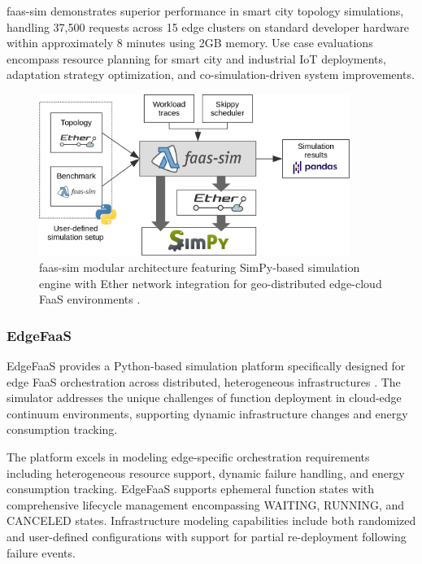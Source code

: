 faas-sim demonstrates superior performance in smart city topology simulations, handling 37,500 requests across 15 edge clusters on standard developer hardware within approximately 8 minutes using 2GB memory. Use case evaluations encompass resource planning for smart city and industrial IoT deployments, adaptation strategy optimization, and co-simulation-driven system improvements.

\begin{figure}[htbp]
\centering
\includegraphics[width=0.9\textwidth]{assets/faas-sim arch.png}
\caption{faas-sim modular architecture featuring SimPy-based simulation engine with Ether network integration for geo-distributed edge-cloud FaaS environments \cite{boughzala2022faassim}.}
\label{fig:faas-sim-architecture}
\end{figure}


\subsubsection{EdgeFaaS}

EdgeFaaS provides a Python-based simulation platform specifically designed for edge FaaS orchestration across distributed, heterogeneous infrastructures \cite{li2022edgefaas}. The simulator addresses the unique challenges of function deployment in cloud-edge continuum environments, supporting dynamic infrastructure changes and energy consumption tracking.

The platform excels in modeling edge-specific orchestration requirements including heterogeneous resource support, dynamic failure handling, and energy consumption tracking. EdgeFaaS supports ephemeral function states with comprehensive lifecycle management encompassing WAITING, RUNNING, and CANCELED states. Infrastructure modeling capabilities include both randomized and user-defined configurations with support for partial re-deployment following failure events.

